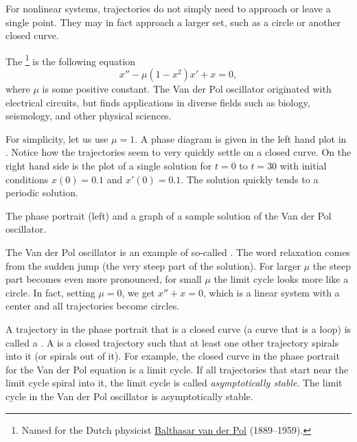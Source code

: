 
For nonlinear systems, trajectories do
not simply need to approach or leave a single point.  They may in fact approach a
larger set, such as a circle or another closed curve.

\begin{example}
The \emph{}\footnote{Named for the
Dutch physicist 
\href{https://en.wikipedia.org/wiki/Balthasar_van_der_Pol}{Balthasar van der
Pol} (1889--1959).}
is the following equation
\begin{equation*}
x''-\mu(1-x^2) x' + x = 0,
\end{equation*}
where $\mu$ is some positive constant.  The Van der Pol oscillator
originated with electrical circuits, but finds applications
in diverse fields such as biology, seismology, and
other physical sciences.

For simplicity, let us use $\mu = 1$.  A
phase diagram is given in the left hand plot in
.  Notice how the
trajectories seem to very quickly settle on a closed curve.  On the right
hand side is the plot of a single solution for $t=0$ to $t=30$ with
initial conditions $x(0) = 0.1$ and $x'(0) = 0.1$.  The solution
quickly tends to a periodic solution.
\begin{myfig}
\capstart
\caption{The phase portrait (left) and a graph of a sample solution
of the Van der Pol oscillator.\label{fig:nlin-van-der-fig}}
\end{myfig}

The Van der Pol oscillator is an 
example of so-called \emph{}.  The word
relaxation comes from the sudden jump (the very steep part of the solution).
For larger $\mu$ the steep part becomes even more pronounced, for small $\mu$ 
the limit cycle looks more like a circle.  In fact, setting
$\mu = 0$, we get $x''+x=0$, which is a linear system with a
center and all trajectories become circles.
\end{example}

A trajectory in the phase portrait that is a closed 
curve (a curve that is a loop) is called a 
\emph{}.
A \emph{}
is a closed trajectory such
that at least one other trajectory spirals into it (or spirals out of it).
For example, the closed curve in the phase portrait for the Van der Pol
equation is a limit cycle.
If all trajectories that start near the limit cycle spiral into it, the
limit cycle is called
\emph{asymptotically stable}.
The limit cycle in the Van der Pol oscillator is 
asymptotically stable.

